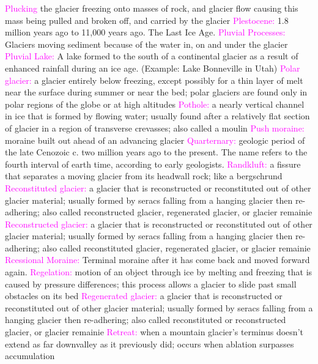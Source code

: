 \documentclass{article}
\newcommand{\pink}[1]{\textcolor{magenta}{#1}}
\newcommand{\vocab}[1]{{\pink{#1}}}
\begin{document}
\begin{multicols*}{4}
		\vocab{Plucking} the glacier freezing onto masses of rock, and glacier flow causing this mass being pulled and broken off, and carried by the glacier  
		\vocab{Plestocene: } 1.8 million years ago to 11,000 years ago. The Last Ice Age.   
		\vocab{Pluvial Processes: } Glaciers moving sediment because of the water in, on and under the glacier  
		\vocab{Pluvial Lake: } A lake formed to the south of a continental glacier as a result of enhanced rainfall during an ice age. (Example: Lake Bonneville in Utah)  
		\vocab{        Polar glacier: } a glacier entirely below freezing, except possibly for a thin layer of melt near the surface during summer or near the bed; polar glaciers are found only in polar regions of the globe or at high altitudes 
		\vocab{        Pothole: } a nearly vertical channel in ice that is formed by flowing water; usually found after a relatively flat section of glacier in a region of transverse crevasses; also called a moulin 
		\vocab{        Push moraine: } moraine built out ahead of an advancing glacier 
		\vocab{Quarternary: } geologic period of the late Cenozoic c. two million years ago to the present. The name refers to the fourth interval of earth time, according to early geologists.   
		\vocab{        Randkluft: } a fissure that separates a moving glacier from its headwall rock; like a bergschrund 
		\vocab{        Reconstituted glacier: } a glacier that is reconstructed or reconstituted out of other glacier material; usually formed by seracs falling from a hanging glacier then re-adhering; also called reconstructed glacier, regenerated glacier, or glacier remainie 
		\vocab{        Reconstructed glacier: } a glacier that is reconstructed or reconstituted out of other glacier material; usually formed by seracs falling from a hanging glacier then re-adhering; also called reconstituted glacier, regenerated glacier, or glacier remainie 
		\vocab{Rcessional Moraine: } Terminal moraine after it has come back and moved forward again. 
		\vocab{ Regelation: } motion of an object through ice by melting and freezing that is caused by pressure differences; this process allows a glacier to slide past small obstacles on its bed  
		\vocab{        Regenerated glacier: } a glacier that is reconstructed or reconstituted out of other glacier material; usually formed by seracs falling from a hanging glacier then re-adhering; also called reconstituted or reconstructed glacier, or glacier remainie 
		\vocab{        Retreat: } when a mountain glacier's terminus doesn't extend as far downvalley as it previously did; occurs when ablation surpasses accumulation 

\end{multicols*}
\end{document}
